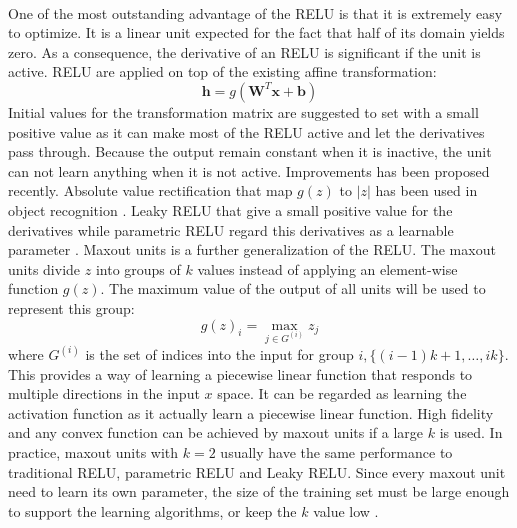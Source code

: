 \paragraph{}
One of the most outstanding advantage of the RELU is that it is extremely easy to optimize.
It is a linear unit expected for the fact that half of its domain yields zero.
As a consequence, the derivative of an RELU is significant if the unit is active.
RELU are applied on top of the existing affine transformation:
\begin{equation}
    \mathbf{h} = g( \mathbf{W}^T \mathbf{x} + \mathbf{b})
\end{equation}
%
Initial values for the transformation matrix are suggested to set with a small positive value as it can make most of the RELU active and let the derivatives pass through.
Because the output remain constant when it is inactive, the unit can not learn anything when it is not active.
Improvements has been proposed recently.
Absolute value rectification that map $g(z)$ to $|z|$ has been used in object recognition \cite{jarret2009}.
Leaky RELU that give a small positive value for the derivatives \cite{maas2013} while parametric RELU regard this derivatives as a learnable parameter \cite{He2015}.
Maxout units \cite{Goodfellow2013} is a further generalization of the RELU.
The maxout units divide $z$ into groups of $k$ values instead of applying an element-wise function $g(z)$.
The maximum value of the output of all units will be used to represent this group:
\begin{equation}
    g(z)_i = \max_{j\in G^{(i)}} z_j
\end{equation}
%
where $G^{(i)}$ is the set of indices into the input for group $i, \{(i-1)k+1, \dots, ik \}$.
This provides a way of learning a piecewise linear function that responds to multiple directions in the input $x$ space.
It can be regarded as learning the activation function as it actually learn a piecewise linear function.
High fidelity and any convex function can be achieved by maxout units if a large $k$ is used.
In practice, maxout units with $k=2$ usually have the same performance to traditional RELU, parametric RELU and Leaky RELU.
Since every maxout unit need to learn its own parameter, the size of the training set must be large enough to support the learning algorithms, or keep the $k$ value low \cite{Cai2013}.





